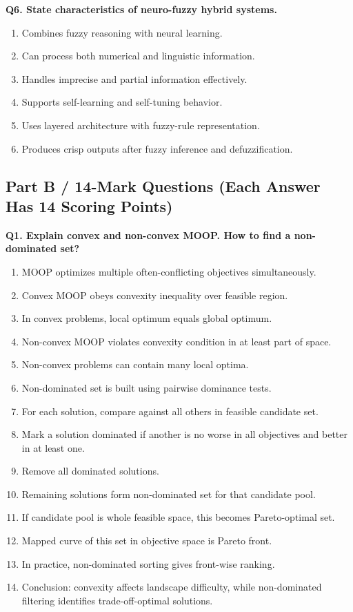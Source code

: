 \documentclass[11pt,a4paper]{article}
\begin{document}
\textbf{Q6. State characteristics of neuro-fuzzy hybrid systems.}
\begin{enumerate}
\item Combines fuzzy reasoning with neural learning.
\item Can process both numerical and linguistic information.
\item Handles imprecise and partial information effectively.
\item Supports self-learning and self-tuning behavior.
\item Uses layered architecture with fuzzy-rule representation.
\item Produces crisp outputs after fuzzy inference and defuzzification.
\end{enumerate}

\subsection*{Part B / 14-Mark Questions (Each Answer Has 14 Scoring Points)}

\textbf{Q1. Explain convex and non-convex MOOP. How to find a non-dominated set?}
\begin{enumerate}
\item MOOP optimizes multiple often-conflicting objectives simultaneously.
\item Convex MOOP obeys convexity inequality over feasible region.
\item In convex problems, local optimum equals global optimum.
\item Non-convex MOOP violates convexity condition in at least part of space.
\item Non-convex problems can contain many local optima.
\item Non-dominated set is built using pairwise dominance tests.
\item For each solution, compare against all others in feasible candidate set.
\item Mark a solution dominated if another is no worse in all objectives and better in at least one.
\item Remove all dominated solutions.
\item Remaining solutions form non-dominated set for that candidate pool.
\item If candidate pool is whole feasible space, this becomes Pareto-optimal set.
\item Mapped curve of this set in objective space is Pareto front.
\item In practice, non-dominated sorting gives front-wise ranking.
\item Conclusion: convexity affects landscape difficulty, while non-dominated filtering identifies trade-off-optimal solutions.
\end{enumerate}
\end{document}
